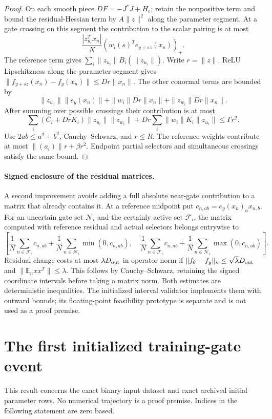 \documentclass[10pt]{article}
\begin{document}
\begin{proof}
On each smooth piece $DF=-J^*J+H_e$; retain the nonpositive term and bound
the residual-Hessian term by $A\|z\|^2$ along the parameter segment.
At a gate crossing on this segment the contribution to the scalar pairing
is at most
\[
 \frac{|z_{u_i}^Tx_n|}{N}
                 (w_i(s)^Te_{y+sz}(x_n))_+.
\]
The reference term gives $\sum_i\|z_{u_i}\|B_i(\|z_{u_i}\|)$.
Write $r=\|z\|$. ReLU Lipschitzness along the parameter segment gives
$\|f_{y+sz}(x_n)-f_y(x_n)\|\le Dr\|x_n\|$.
The other conormal terms are bounded by
\[
 \|z_{w_i}\|\|e_y(x_n)\|
 +\|w_i\|Dr\|x_n\|+\|z_{w_i}\|Dr\|x_n\|.
\]
After summing over possible crossings their contribution is at most
\[
 \sum_i(C_i+DrK_i)\|z_{u_i}\|\|z_{w_i}\|
 +Dr\sum_i\|w_i\|K_i\|z_{u_i}\|
 \le\Gamma r^2.
\]
Use $2ab\le a^2+b^2$, Cauchy--Schwarz, and $r\le R$.
The reference weights contribute at most $\|(a_i)\|r+\beta r^2$.
Endpoint partial selectors and simultaneous crossings satisfy the same bound.
\end{proof}

\paragraph{Signed enclosure of the residual matrices.}
A second improvement avoids adding a full absolute near-gate contribution
to a matrix that already contains it. At a reference midpoint put
$c_{n,ab}=e_y(x_n)_a x_{n,b}$. For an uncertain gate set $\mathcal N_i$
and the certainly active set $\mathcal F_i$, the matrix computed with
reference residual and actual selectors belongs entrywise to
\[
 \left[\frac1N\sum_{n\in\mathcal F_i}c_{n,ab}
       +\frac1N\sum_{n\in\mathcal N_i}\min(0,c_{n,ab}),\quad
       \frac1N\sum_{n\in\mathcal F_i}c_{n,ab}
       +\frac1N\sum_{n\in\mathcal N_i}\max(0,c_{n,ab})\right].
\]
Residual change costs at most $\lambda D_{\rm out}$ in operator norm if
$\|f_\theta-f_y\|_n\le\sqrt\lambda D_{\rm out}$ and
$\|\mathbb E_n xx^T\|\le\lambda$. This follows by Cauchy--Schwarz,
retaining the signed coordinate intervals before taking a matrix norm.
Both estimates are deterministic inequalities. The initialized interval
validator implements them with outward bounds; its floating-point
feasibility prototype is separate and is not used as a proof premise.

\section{The first initialized training-gate event}
This result concerns the exact binary input dataset and exact archived
initial parameter rows. No numerical trajectory is a proof premise.
Indices in the following statement are zero based.
\end{document}
